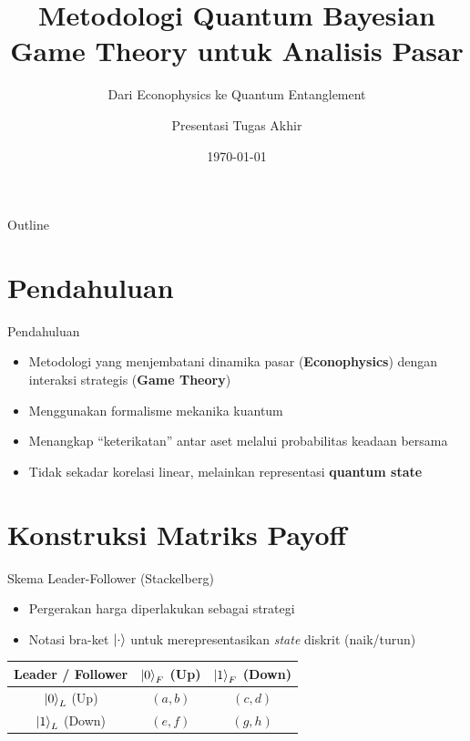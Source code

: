 \documentclass[aspectratio=169]{beamer}
\title{Metodologi Quantum Bayesian Game Theory untuk Analisis Pasar}
\subtitle{Dari Econophysics ke Quantum Entanglement}
\author{Presentasi Tugas Akhir}
\date{\today}
\begin{document}
\begin{frame}
    \titlepage
\end{frame}

\begin{frame}{Outline}
    \tableofcontents
\end{frame}

\section{Pendahuluan}

\begin{frame}{Pendahuluan}
    \begin{itemize}
        \item Metodologi yang menjembatani dinamika pasar (\textbf{Econophysics}) dengan interaksi strategis (\textbf{Game Theory})
        \item Menggunakan formalisme mekanika kuantum
        \item Menangkap ``keterikatan'' antar aset melalui probabilitas keadaan bersama
        \item Tidak sekadar korelasi linear, melainkan representasi \textbf{quantum state}
    \end{itemize}
\end{frame}

\section{Konstruksi Matriks Payoff}

\begin{frame}{Skema Leader-Follower (Stackelberg)}
    \begin{itemize}
        \item Pergerakan harga diperlakukan sebagai strategi
        \item Notasi bra-ket $\ket{\cdot}$ untuk merepresentasikan \textit{state} diskrit (naik/turun)
    \end{itemize}
    
    \vspace{0.5cm}
    
    \begin{table}
        \centering
        \begin{tabular}{c|c|c}
            \toprule
            \textbf{Leader / Follower} & $\ket{0}_F$ (Up) & $\ket{1}_F$ (Down) \\
            \midrule
            $\ket{0}_L$ (Up) & $(a, b)$ & $(c, d)$ \\
            $\ket{1}_L$ (Down) & $(e, f)$ & $(g, h)$ \\
            \bottomrule
        \end{tabular}
    \end{table}
\end{frame}
\end{document}
